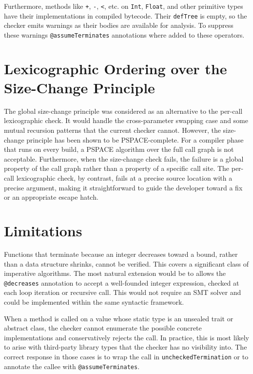 Furthermore, methods like \texttt{+}, \texttt{-}, \texttt{<}, etc. on
\texttt{Int}, \texttt{Float}, and other primitive types have their
implementations in compiled bytecode. Their \texttt{defTree} is empty, so the
checker emits warnings as their bodies are available for analysis. To suppress
these warnings \texttt{@assumeTerminates} annotations where added to these
operators.


\section{Lexicographic Ordering over the Size-Change Principle}
The global size-change principle \cite{SizeChange} was considered as an
alternative to the per-call lexicographic check. It would handle the
cross-parameter swapping case and some mutual recursion patterns that the
current checker cannot.
However, the size-change principle has been shown to be PSPACE-complete. For a
compiler phase that runs on every build, a PSPACE algorithm over the full call
graph is not acceptable.
Furthermore, when the size-change check fails, the failure is a global property
of the call graph rather than a property of a specific call site. The per-call
lexicographic check, by contrast, fails at a precise source location with a
precise argument, making it straightforward to guide the developer toward a fix
or an appropriate escape hatch.


\section{Limitations}
Functions that terminate because an integer decreases toward a bound, rather
than a data structure shrinks, cannot be verified. This covers a significant
class of imperative algorithms. The most natural extension would be to allows
the \texttt{@decreases} annotation to accept a well-founded integer expression,
checked at each loop iteration or recursive call. This would not require an SMT
solver and could be implemented within the same syntactic framework.

When a method is called on a value whose static type is an unsealed trait or
abstract class, the checker cannot enumerate the possible concrete
implementations and conservatively rejects the call. In practice, this is most
likely to arise with third-party library types that the checker has no
visibility into. The correct response in those cases is to wrap the call in
\texttt{uncheckedTermination} or to annotate the callee with
\texttt{@assumeTerminates}.

